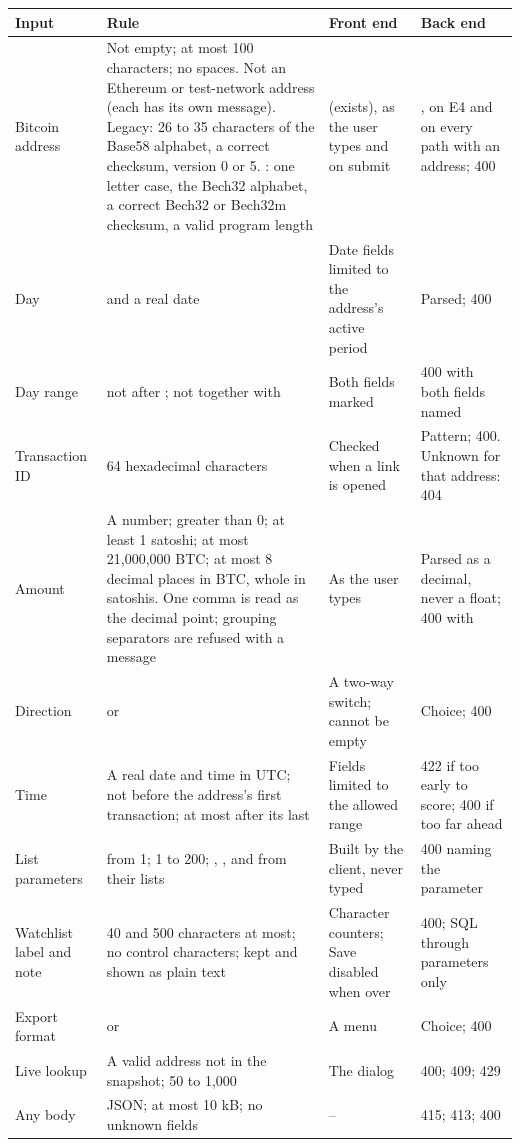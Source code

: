{\small
\begin{longtable}{@{}L{2.2cm}L{5.5cm}L{3.2cm}L{3.2cm}@{}}
\toprule
\textbf{Input} & \textbf{Rule} & \textbf{Front end} & \textbf{Back end} \\
\midrule
\endhead
Bitcoin address & Not empty; at most 100 characters; no spaces. Not an Ethereum or test-network address (each has its own message). Legacy: 26 to 35 characters of the Base58 alphabet, a correct checksum, version 0 or 5. : one letter case, the Bech32 alphabet, a correct Bech32 or Bech32m checksum, a valid program length &  (exists), as the user types and on submit & , on E4 and on every path with an address; 400 \\
Day &  and a real date & Date fields limited to the address's active period & Parsed; 400 \\
Day range &  not after ; not together with  & Both fields marked & 400 with both fields named \\
Transaction ID & 64 hexadecimal characters & Checked when a link is opened & Pattern; 400. Unknown for that address: 404 \\
Amount & A number; greater than 0; at least 1 satoshi; at most 21,000,000 BTC; at most 8 decimal places in BTC, whole in satoshis. One comma is read as the decimal point; grouping separators are refused with a message & As the user types & Parsed as a decimal, never a float; 400 with  \\
Direction &  or  & A two-way switch; cannot be empty & Choice; 400 \\
Time & A real date and time in UTC; not before the address's first transaction; at most  after its last & Fields limited to the allowed range & 422 if too early to score; 400 if too far ahead \\
List parameters &  from 1;  1 to 200; , ,  and  from their lists & Built by the client, never typed & 400 naming the parameter \\
Watchlist label and note & 40 and 500 characters at most; no control characters; kept and shown as plain text & Character counters; Save disabled when over & 400; SQL through parameters only \\
Export format &  or  & A menu & Choice; 400 \\
Live lookup & A valid address not in the snapshot;  50 to 1,000 & The dialog & 400; 409; 429 \\
Any body & JSON; at most 10 kB; no unknown fields & -- & 415; 413; 400 \\
\bottomrule
\end{longtable}
}


